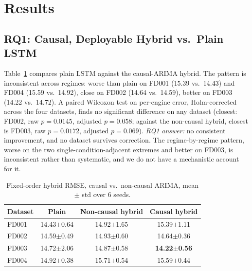 \documentclass[conference]{IEEEtran}
\begin{document}
\section{Results}

\subsection{RQ1: Causal, Deployable Hybrid vs.\ Plain LSTM}
Table~\ref{tab:causal} compares plain LSTM against the causal-ARIMA hybrid. The pattern is inconsistent across regimes: worse than plain on FD001 (15.39 vs.\ 14.43) and FD004 (15.59 vs.\ 14.92), close on FD002 (14.64 vs.\ 14.59), better on FD003 (14.22 vs.\ 14.72). A paired Wilcoxon test on per-engine error, Holm-corrected across the four datasets, finds no significant difference on any dataset (closest: FD002, raw $p=0.0145$, adjusted $p=0.058$; against the non-causal hybrid, closest is FD003, raw $p=0.0172$, adjusted $p=0.069$). \emph{RQ1 answer:} no consistent improvement, and no dataset survives correction. The regime-by-regime pattern, worse on the two single-condition-adjacent extremes and better on FD003, is inconsistent rather than systematic, and we do not have a mechanistic account for it.

\begin{table}[t]
\centering
\caption{Fixed-order hybrid RMSE, causal vs.\ non-causal ARIMA, mean $\pm$ std over 6 seeds.}
\label{tab:causal}
\footnotesize
\begin{tabular}{lccc}
\toprule
Dataset & Plain & Non-causal hybrid & Causal hybrid \\
\midrule
FD001 & 14.43{\tiny$\pm$0.64} & 14.92{\tiny$\pm$1.65} & 15.39{\tiny$\pm$1.11} \\
FD002 & 14.59{\tiny$\pm$0.49} & 14.93{\tiny$\pm$0.60} & 14.64{\tiny$\pm$0.36} \\
FD003 & 14.72{\tiny$\pm$2.06} & 14.87{\tiny$\pm$0.58} & \textbf{14.22{\tiny$\pm$0.56}} \\
FD004 & 14.92{\tiny$\pm$0.38} & 15.71{\tiny$\pm$0.54} & 15.59{\tiny$\pm$0.44} \\
\bottomrule
\end{tabular}
\end{table}
\end{document}
